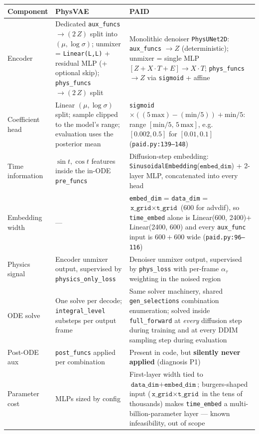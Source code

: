 \documentclass[11pt,a4paper]{article}
\newcommand{\code}[1]{\texttt{#1}}
\begin{document}
\begin{table}[h]
\centering
\small
\begin{tabularx}{\textwidth}{LXX}
\toprule
\textbf{Component} & \textbf{PhysVAE} & \textbf{PAID} \\
\midrule
Encoder & Dedicated \code{aux\_funcs} $\to (2\,Z)$ split into $(\mu, \log\sigma)$; unmixer = \code{Linear(L,L)} + residual MLP (+ optional skip); \code{phys\_funcs} $\to (2\,Z)$ split & Monolithic denoiser \code{PhysUNet2D}: \code{aux\_funcs} $\to Z$ (deterministic); unmixer = single MLP $[Z + X\cdot T + E] \to X\cdot T$; \code{phys\_funcs} $\to Z$ via \code{sigmoid} + affine \\
Coefficient head & Linear $(\mu, \log\sigma)$ split; sample clipped to the model's range; evaluation uses the posterior mean & \code{sigmoid}$\times((5\,\mathrm{max}) - (\mathrm{min}/5)) + \mathrm{min}/5$: range $[\mathrm{min}/5,\,5\,\mathrm{max}]$, e.g.\ $[0.002, 0.5]$ for $[0.01, 0.1]$ (\code{paid.py:139--148}) \\
Time information & $\sin t, \cos t$ features inside the in-ODE \code{pre\_funcs} & Diffusion-step embedding: \code{SinusoidalEmbedding}($\code{embed\_dim}$) + 2-layer MLP, concatenated into every head \\
Embedding width & --- & \code{embed\_dim} = \code{data\_dim} = $\code{x\_grid}\times\code{t\_grid}$ (600 for advdif), so \code{time\_embed} alone is Linear(600, 2400)$+$Linear(2400, 600) and every \code{aux\_func} input is $600 + 600$ wide (\code{paid.py:96--116}) \\
Physics signal & Encoder unmixer output, supervised by \code{physics\_only\_loss} & Denoiser unmixer output, supervised by \code{phys\_loss} with per-frame $\alpha_\tau$ weighting in the noised region \\
ODE solve & One solve per decode; \code{integral\_level} substeps per output frame & Same solver machinery, shared \code{gen\_selections} combination enumeration; solved inside \code{full\_forward} at \emph{every} diffusion step during training and at every DDIM sampling step during evaluation \\
Post-ODE aux & \code{post\_funcs} applied per combination & Present in code, but \textbf{silently never applied} (diagnosis P1) \\
Parameter cost & MLPs sized by config & First-layer width tied to $\code{data\_dim} + \code{embed\_dim}$; burgers-shaped input ($\code{x\_grid}\times\code{t\_grid}$ in the tens of thousands) makes \code{time\_embed} a multi-billion-parameter layer --- known infeasibility, out of scope \\
\bottomrule
\end{tabularx}
\end{table}
\end{document}
